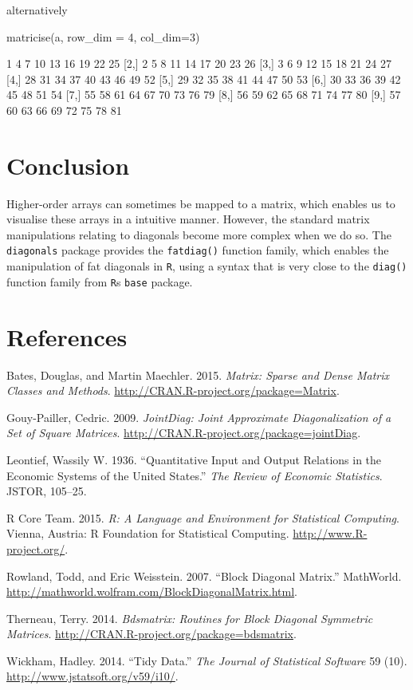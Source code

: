 \documentclass[article]{jss}
\begin{document}
alternatively

\begin{CodeChunk}
\begin{CodeInput}
matricise(a, row_dim = 4, col_dim=3)
\end{CodeInput}
\begin{CodeOutput}
      [,1] [,2] [,3] [,4] [,5] [,6] [,7] [,8] [,9]
 [1,]    1    4    7   10   13   16   19   22   25
 [2,]    2    5    8   11   14   17   20   23   26
 [3,]    3    6    9   12   15   18   21   24   27
 [4,]   28   31   34   37   40   43   46   49   52
 [5,]   29   32   35   38   41   44   47   50   53
 [6,]   30   33   36   39   42   45   48   51   54
 [7,]   55   58   61   64   67   70   73   76   79
 [8,]   56   59   62   65   68   71   74   77   80
 [9,]   57   60   63   66   69   72   75   78   81
\end{CodeOutput}
\end{CodeChunk}

\section{Conclusion}\label{conclusion}

Higher-order arrays can sometimes be mapped to a matrix, which enables
us to visualise these arrays in a intuitive manner. However, the
standard matrix manipulations relating to diagonals become more complex
when we do so. The \texttt{diagonals} package provides the
\texttt{fatdiag()} function family, which enables the manipulation of
fat diagonals in \texttt{R}, using a syntax that is very close to the
\texttt{diag()} function family from \texttt{R}s \texttt{base} package.

\section*{References}\label{references}

Bates, Douglas, and Martin Maechler. 2015. \emph{Matrix: Sparse and
Dense Matrix Classes and Methods}.
\url{http://CRAN.R-project.org/package=Matrix}.

Gouy-Pailler, Cedric. 2009. \emph{JointDiag: Joint Approximate
Diagonalization of a Set of Square Matrices}.
\url{http://CRAN.R-project.org/package=jointDiag}.

Leontief, Wassily W. 1936. ``Quantitative Input and Output Relations in
the Economic Systems of the United States.'' \emph{The Review of
Economic Statistics}. JSTOR, 105--25.

R Core Team. 2015. \emph{R: A Language and Environment for Statistical
Computing}. Vienna, Austria: R Foundation for Statistical Computing.
\url{http://www.R-project.org/}.

Rowland, Todd, and Eric Weisstein. 2007. ``Block Diagonal Matrix.''
MathWorld. \url{http://mathworld.wolfram.com/BlockDiagonalMatrix.html}.

Therneau, Terry. 2014. \emph{Bdsmatrix: Routines for Block Diagonal
Symmetric Matrices}. \url{http://CRAN.R-project.org/package=bdsmatrix}.

Wickham, Hadley. 2014. ``Tidy Data.'' \emph{The Journal of Statistical
Software} 59 (10). \url{http://www.jstatsoft.org/v59/i10/}.
\end{document}
